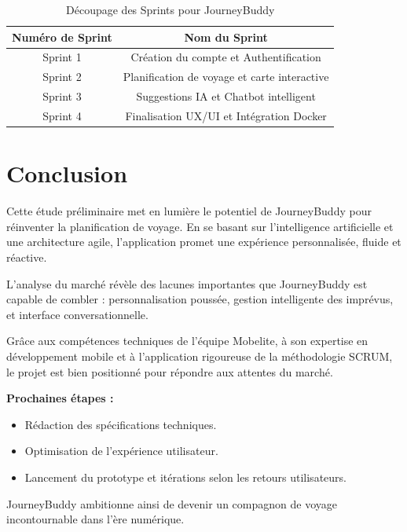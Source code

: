 \begin{table}[H]
    \centering
    \begin{tabular}{|c|c|}
        \hline
        \textbf{Numéro de Sprint} & \textbf{Nom du Sprint} \\
        \hline
        Sprint 1 & Création du compte et Authentification \\
        \hline
        Sprint 2 & Planification de voyage et carte interactive \\
        \hline
        Sprint 3 & Suggestions IA et Chatbot intelligent \\
        \hline
        Sprint 4 & Finalisation UX/UI et Intégration Docker \\
        \hline
    \end{tabular}
    \caption{Découpage des Sprints pour JourneyBuddy}
    \label{tab:sprints}
\end{table}

\section{Conclusion}

Cette étude préliminaire met en lumière le potentiel de JourneyBuddy pour réinventer la planification de voyage. En se basant sur l’intelligence artificielle et une architecture agile, l’application promet une expérience personnalisée, fluide et réactive.

L’analyse du marché révèle des lacunes importantes que JourneyBuddy est capable de combler : personnalisation poussée, gestion intelligente des imprévus, et interface conversationnelle.

Grâce aux compétences techniques de l’équipe Mobelite, à son expertise en développement mobile et à l’application rigoureuse de la méthodologie SCRUM, le projet est bien positionné pour répondre aux attentes du marché.

\textbf{Prochaines étapes :}
\begin{itemize}
    \item Rédaction des spécifications techniques.
    \item Optimisation de l’expérience utilisateur.
    \item Lancement du prototype et itérations selon les retours utilisateurs.
\end{itemize}

JourneyBuddy ambitionne ainsi de devenir un compagnon de voyage incontournable dans l’ère numérique.
